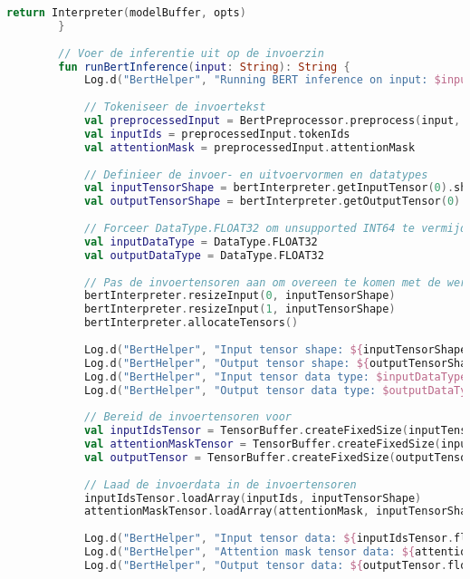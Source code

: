 \begin{lstlisting}[language=Kotlin, caption={Implementatie van BertHelper}]
            return Interpreter(modelBuffer, opts)
        }
        
        // Voer de inferentie uit op de invoerzin
        fun runBertInference(input: String): String {
            Log.d("BertHelper", "Running BERT inference on input: $input")
            
            // Tokeniseer de invoertekst
            val preprocessedInput = BertPreprocessor.preprocess(input, vocab)
            val inputIds = preprocessedInput.tokenIds
            val attentionMask = preprocessedInput.attentionMask
            
            // Definieer de invoer- en uitvoervormen en datatypes
            val inputTensorShape = bertInterpreter.getInputTensor(0).shape()
            val outputTensorShape = bertInterpreter.getOutputTensor(0).shape()
            
            // Forceer DataType.FLOAT32 om unsupported INT64 te vermijden
            val inputDataType = DataType.FLOAT32
            val outputDataType = DataType.FLOAT32
            
            // Pas de invoertensoren aan om overeen te komen met de werkelijke vormen
            bertInterpreter.resizeInput(0, inputTensorShape)
            bertInterpreter.resizeInput(1, inputTensorShape)
            bertInterpreter.allocateTensors()
            
            Log.d("BertHelper", "Input tensor shape: ${inputTensorShape.contentToString()}")
            Log.d("BertHelper", "Output tensor shape: ${outputTensorShape.contentToString()}")
            Log.d("BertHelper", "Input tensor data type: $inputDataType")
            Log.d("BertHelper", "Output tensor data type: $outputDataType")
            
            // Bereid de invoertensoren voor
            val inputIdsTensor = TensorBuffer.createFixedSize(inputTensorShape, inputDataType)
            val attentionMaskTensor = TensorBuffer.createFixedSize(inputTensorShape, inputDataType)
            val outputTensor = TensorBuffer.createFixedSize(outputTensorShape, outputDataType)
            
            // Laad de invoerdata in de invoertensoren
            inputIdsTensor.loadArray(inputIds, inputTensorShape)
            attentionMaskTensor.loadArray(attentionMask, inputTensorShape)
            
            Log.d("BertHelper", "Input tensor data: ${inputIdsTensor.floatArray.contentToString()}")
            Log.d("BertHelper", "Attention mask tensor data: ${attentionMaskTensor.floatArray.contentToString()}")
            Log.d("BertHelper", "Output tensor data: ${outputTensor.floatArray.contentToString()}")
            

\end{lstlisting}
